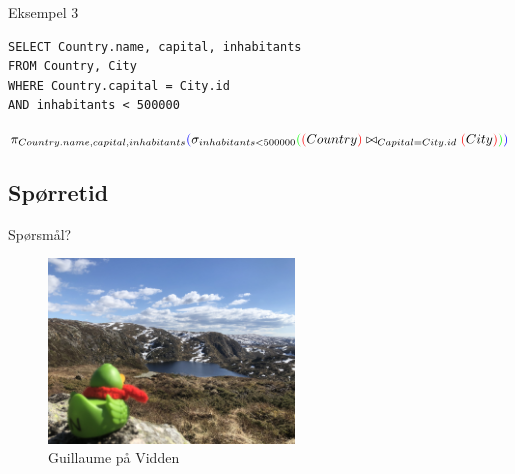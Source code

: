 \begin{frame}[fragile]{Eksempel 3}
\begin{verbatim}
SELECT Country.name, capital, inhabitants
FROM Country, City
WHERE Country.capital = City.id
AND inhabitants < 500000
\end{verbatim}
\pause
$\pi_{Country.name, capital, inhabitants}\textcolor{blue}{(}\sigma_{inhabitants < 500000}\textcolor{green}{(}\textcolor{red}{(}Country\textcolor{red}{)}\bowtie_{Capital=City.id}\textcolor{red}{(}City\textcolor{red}{)}\textcolor{green}{)}\textcolor{blue}{)}$
\end{frame}

\subsection*{Spørretid}
\begin{frame}{Spørsmål?}
    \begin{figure}
        \centering
        \includegraphics[height = 4.9cm]{images/guillaume4.jpg}
        \caption{Guillaume på Vidden}
        \label{fig:guillaume4}
    \end{figure}
\end{frame}